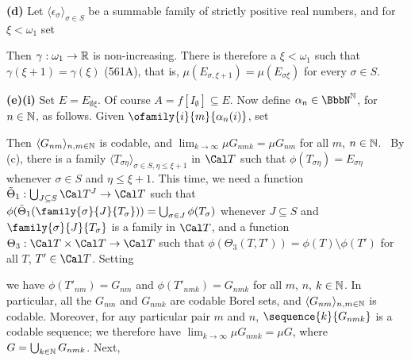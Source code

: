 {\medskip

{\bf (d)} Let
$\langle\epsilon_{\sigma}\rangle_{\sigma\in S}$ be a
summable family of strictly positive real numbers, and for $\xi<\omega_1$
set


\noindent Then $\gamma:\omega_1\to\Bbb R$ is non-increasing.   There is
therefore a $\xi<\omega_1$ such that $\gamma(\xi+1)=\gamma(\xi)$ (561A),
that is,
$\mu(E_{\sigma,\xi+1})=\mu(E_{\sigma\xi})$ for every $\sigma\in S$.

\medskip

{\bf (e)(i)} Set $E=E_{\emptyset\xi}$.
Of course $A=f[I_{\emptyset}]\subseteq E$.
Now define $\alpha_n\in\NN$, for $n\in\Bbb N$, as follows.   Given
$\ofamily{i}{m}{\alpha_n(i)}$, set



\noindent Then $\langle G_{nm}\rangle_{n,m\in\Bbb N}$ is codable,
and $\lim_{k\to\infty}\mu G_{nmk}=\mu G_{nm}$ for all $m$,
$n\in\Bbb N$.   \Prf\ By (c), there is a family
$\langle T_{\sigma\eta}\rangle_{\sigma\in S,\eta\le\xi+1}$
in $\Cal T$ such
that $\phi(T_{\sigma\eta})=E_{\sigma\eta}$ whenever $\sigma\in S$ and
$\eta\le\xi+1$.
This time, we need a function
$\tilde\Theta_1:\bigcup_{J\subseteq S}\Cal T^J\to\Cal T$
such that $\phi(\tilde\Theta_1(\family{\sigma}{J}{T_{\sigma}}))
=\bigcup_{\sigma\in J}\phi(T_{\sigma})$ whenever
$J\subseteq S$ and $\family{\sigma}{J}{T_{\sigma}}$ is a family
in $\Cal T$, and a function $\Theta_3:\Cal T\times\Cal T\to\Cal T$ such
that $\phi(\Theta_3(T,T'))=\phi(T)\setminus\phi(T')$ for all $T$,
$T'\in\Cal T$.   Setting



\noindent we have $\phi(T'_{nm})=G_{nm}$ and $\phi(T'_{nmk})=G_{nmk}$ for
all $m$, $n$, $k\in\Bbb N$.   In particular, all the $G_{nm}$ and $G_{nmk}$
are codable Borel sets, and $\langle G_{nm}\rangle_{n,m\in\Bbb N}$ is
codable.   Moreover, for any particular pair $m$ and $n$,
$\sequence{k}{G_{nmk}}$ is a codable sequence;
we therefore have $\lim_{k\to\infty}\mu G_{nmk}=\mu G$, where
$G=\bigcup_{k\in\Bbb N}G_{nmk}$.   Next,

}
